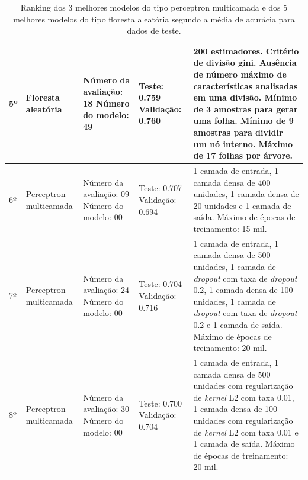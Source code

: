 \begin{table}[ht!]
\begin{center}
{\begin{tabular}{|p{1.25cm}|p{2cm}|p{2cm}|p{2.5cm}|p{6.75cm}|}
    \hline
    5º & Floresta \newline aleatória & Número da \newline avaliação: 18 \newline Número do \newline modelo: 49 & Teste: 0.759 \newline Validação: 0.760 & 200 estimadores. Critério de divisão gini. Ausência de número máximo de características analisadas em uma divisão. Mínimo de 3 amostras para gerar uma folha. Mínimo de 9 amostras para dividir um nó interno. Máximo de 17 folhas por árvore. \\
    \hline
    6º & Perceptron multicamada & Número da \newline avaliação: 09 \newline Número do \newline modelo: 00 & Teste: 0.707 \newline Validação: 0.694 & 1 camada de entrada, 1 camada densa de 400 unidades, 1 camada densa de 20 unidades e 1 camada de saída. Máximo de épocas de treinamento: 15 mil. \\
    \hline
    7º & Perceptron multicamada & Número da \newline avaliação: 24 \newline Número do \newline modelo: 00 & Teste: 0.704 \newline Validação: 0.716 & 1 camada de entrada, 1 camada densa de 500 unidades, 1 camada de \textit{dropout} com taxa de \textit{dropout} 0.2, 1 camada densa de 100 unidades, 1 camada de \textit{dropout} com taxa de \textit{dropout} 0.2 e 1 camada de saída. Máximo de épocas de treinamento: 20 mil. \\
    \hline
    8º & Perceptron multicamada & Número da \newline avaliação: 30 \newline Número do \newline modelo: 00 & Teste: 0.700 \newline Validação: 0.704 & 1 camada de entrada, 1 camada densa de 500 unidades com regularização de \textit{kernel} L2 com taxa 0.01, 1 camada densa de 100 unidades com regularização de \textit{kernel} L2 com taxa 0.01 e 1 camada de saída. Máximo de épocas de treinamento: 20 mil. \\
    \hline
    \end{tabular}
  }
  \caption{Ranking dos 3 melhores modelos do tipo perceptron multicamada e dos 5 melhores modelos do tipo floresta aleatória segundo a média de acurácia para dados de teste.}
  \label{table:ranking_melhores_modelos}
  \end{center}
\end{table}

